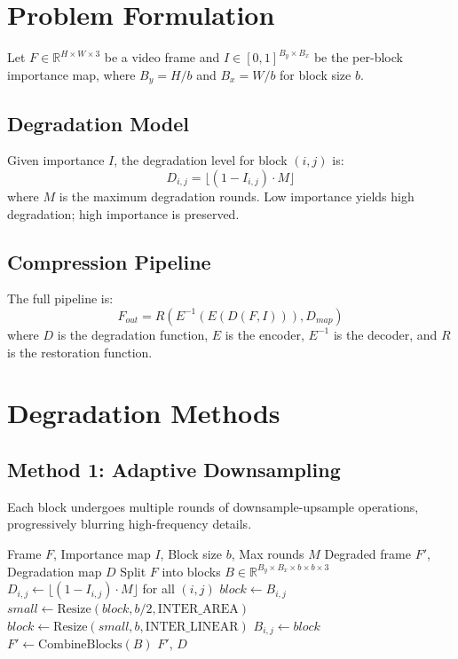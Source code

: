 \documentclass[11pt,a4paper]{article}
\begin{document}
\section{Problem Formulation}

Let $F \in \mathbb{R}^{H \times W \times 3}$ be a video frame and $I \in [0,1]^{B_y \times B_x}$ be the per-block importance map, where $B_y = H/b$ and $B_x = W/b$ for block size $b$.

\subsection{Degradation Model}
Given importance $I$, the degradation level for block $(i,j)$ is:
\begin{equation}
    D_{i,j} = \lfloor (1 - I_{i,j}) \cdot M \rfloor
\end{equation}
where $M$ is the maximum degradation rounds. Low importance yields high degradation; high importance is preserved.

\subsection{Compression Pipeline}
The full pipeline is:
\begin{equation}
    F_{out} = R(E^{-1}(E(D(F, I))), D_{map})
\end{equation}
where $D$ is the degradation function, $E$ is the encoder, $E^{-1}$ is the decoder, and $R$ is the restoration function.

\section{Degradation Methods}

\subsection{Method 1: Adaptive Downsampling}

Each block undergoes multiple rounds of downsample-upsample operations, progressively blurring high-frequency details.

\begin{algorithm}[H]
\caption{Adaptive Downsample Degradation}
\begin{algorithmic}[1]
\Require Frame $F$, Importance map $I$, Block size $b$, Max rounds $M$
\Ensure Degraded frame $F'$, Degradation map $D$
\State Split $F$ into blocks $B \in \mathbb{R}^{B_y \times B_x \times b \times b \times 3}$
\State $D_{i,j} \gets \lfloor (1 - I_{i,j}) \cdot M \rfloor$ for all $(i,j)$
        \State $block \gets B_{i,j}$
            \State $small \gets \text{Resize}(block, b/2, \text{INTER\_AREA})$
            \State $block \gets \text{Resize}(small, b, \text{INTER\_LINEAR})$
        \EndFor
        \State $B_{i,j} \gets block$
    \EndIf
\EndFor
\State $F' \gets \text{CombineBlocks}(B)$
\State \Return $F'$, $D$
\end{algorithmic}
\end{algorithm}
\end{document}
